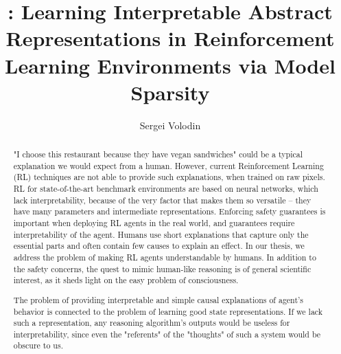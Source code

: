 \documentclass[a4paper,11pt,oneside]{report}
\title{\sysname: Learning Interpretable Abstract Representations in Reinforcement Learning Environments via Model Sparsity}
\author{Sergei Volodin}
\begin{document}
    \maketitle
    \makededication
    \makeacks

\begin{abstract}

"I choose this restaurant because they have vegan sandwiches" could be a typical explanation we would expect from a human. However, current Reinforcement Learning (RL) techniques are not able to provide such explanations, when trained on raw pixels.
RL for state-of-the-art benchmark environments are based on neural networks, which lack interpretability, because of the very factor that makes them so versatile -- they have many parameters and intermediate representations.
Enforcing safety guarantees is important when deploying RL agents in the real world, and guarantees require interpretability of the agent.
Humans use short explanations that capture only the essential parts and often contain few causes to explain an effect.
In our thesis, we address the problem of making RL agents understandable by humans.
In addition to the safety concerns, the quest to mimic human-like reasoning is of general scientific interest, as it sheds light on the easy problem of consciousness.

The problem of providing interpretable and simple causal explanations of agent's behavior is connected to the problem of learning good state representations.
If we lack such a representation, any reasoning algorithm's outputs would be useless for interpretability, since even the "referents" of the "thoughts" of such a system would be obscure to us.


\end{abstract}
\end{document}
